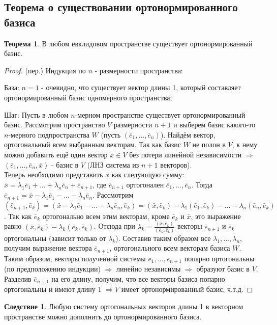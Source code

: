 \documentclass[a4paper, 12pt]{article}
\theoremstyle{definition}
\newtheorem*{theorem}{Теорема}
\newtheorem*{consequense}{Следствие}
\begin{document}
	\subsection{Теорема о существовании ортонормированного базиса}
	\begin{theorem}
		В любом евклидовом пространстве существует ортонормированный базис.
	\end{theorem}
	\begin{proof}
		(пер.)
		Индукция по $n$ - размерности пространства:

		База: $n = 1$ - очевидно, что существует вектор длины 1, который составляет ортонормированный базис одномерного пространства;

		Шаг: Пусть в любом $n$-мерном пространстве существует ортонормированный базис. Рассмотрим пространство $V$ размерности $n+1$ и выберем базис какого-то $n$-мерного подпространства $W$ (пусть $(\bar{e}_{1},...,\bar{e}_{n})$). Найдём вектор, ортогональный всем выбранным векторам. Так как базис $W$ не полон в $V$, к нему можно добавить ещё один вектор $x \in V$ без потери линейной независимости $\Rightarrow$ $(\bar{e}_{1},...,\bar{e}_{n}, \bar{x})$ - базис в $V$ (ЛНЗ система из $n+1$ векторов). \\
		Теперь необходимо представить $\bar{x}$ как следующую сумму: $\bar{x} = \lambda_{1}\bar{e}_{1} + ... + \lambda_{n}\bar{e}_{n} + \bar{e}_{n+1}$, где $\bar{e}_{n+1}$ ортогонален $\bar{e}_{1},...,\bar{e}_{n}$. Тогда $\bar{e}_{n+1} = \bar{x} - \lambda_{1}\bar{e}_{1} - ... - \lambda_{n}\bar{e}_{n}$. Рассмотрим $(\bar{e}_{n+1}, \bar{e}_{k}) = (\bar{x} - \lambda_{1}\bar{e}_{1} - ... - \lambda_{n}\bar{e}_{n}, \bar{e}_{k}) = (\bar{x}, \bar{e}_{k}) - \lambda_{1}(\bar{e}_{1}, \bar{e}_{k}) - ... - \lambda_{n}(\bar{e}_{n}, \bar{e}_{k})$. Так как $\bar{e}_{k}$ ортогонально всем этим векторам, кроме $\bar{e}_{k}$ и $\bar{x}$, это выражение равно $(\bar{x}, \bar{e}_{k}) - \lambda_{k}(\bar{e}_{k}, \bar{e}_{k})$. Отсюда при $\lambda_{k} = \frac{(\bar{x}, \bar{e}_{k})}{(\bar{e}_{k}, \bar{e}_{k})}$ векторы $\bar{e}_{n+1}$ и $\bar{e}_{k}$ ортогональны (зависит только от $\lambda_{k}$). Составив таким образом все $\lambda_{1},...,\lambda_{n}$, получим выражение вектора $\bar{e}_{n+1}$, ортогонального всем векторам базиса $W$.
		Таким образом, векторы полученной системы $\bar{e}_{1},...,\bar{e}_{n+1}$ попарно ортогональны (по предположению индукции) $\Rightarrow$ линейно независимы $\Rightarrow$ образуют базис в $V$. Разделив $\bar{e}_{n+1}$ на его длину, получим, что все векторы базиса попарно ортогональны и имеют длину 1 $\Rightarrow V$ имеет ортонормированный базис, ч.т.д.
	\end{proof}
	\begin{consequense}
		Любую систему ортогональных векторов длины 1 в векторном пространстве можно дополнить до ортонормированного базиса.
	\end{consequense}
\end{document}
